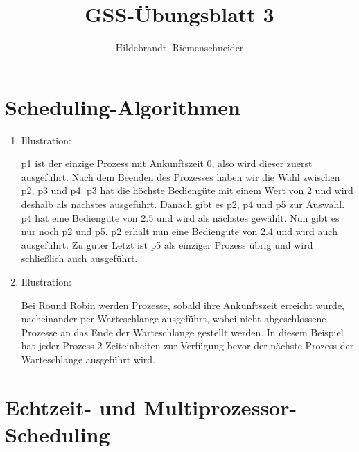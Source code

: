 \documentclass[a4paper,11pt,ngerman]{scrartcl}
\author{Hildebrandt, Riemenschneider}
\title{GSS-Übungsblatt 3}
\begin{document}
\maketitle
\thispagestyle{empty}

\doublespace

\section{Scheduling-Algorithmen}

\begin{enumerate}[\bf a)]
    \item Illustration:\\
        \begin{figure}[h]
            \scalebox{0.56}{}
        \end{figure}

        p1 ist der einzige Prozess mit Ankunftszeit 0, also wird dieser zuerst ausgeführt. Nach dem Beenden des Prozesses haben wir die Wahl zwischen p2, p3 und p4. p3 hat die höchste Bediengüte mit einem Wert von 2 und wird deshalb als nächstes ausgeführt. Danach gibt es p2, p4 und p5 zur Auswahl. p4 hat eine Bediengüte von 2.5 und wird als nächstes gewählt. Nun gibt es nur noch p2 und p5. p2 erhält nun eine Bediengüte von 2.4 und wird auch ausgeführt. Zu guter Letzt ist p5 als einziger Prozess übrig und wird schließlich auch ausgeführt.

    \item Illustration:\\
        \begin{figure}[h]
            \scalebox{0.5}{}
        \end{figure}

        Bei Round Robin werden Prozesse, sobald ihre Ankunftszeit erreicht wurde, nacheinander per Warteschlange ausgeführt, wobei nicht-abgeschlossene Prozesse an das Ende der Warteschlange gestellt werden. In diesem Beispiel hat jeder Prozess 2 Zeiteinheiten zur Verfügung bevor der nächste Prozess der Warteschlange ausgeführt wird.
\end{enumerate}

\section{Echtzeit- und Multiprozessor-Scheduling}
\end{document}
